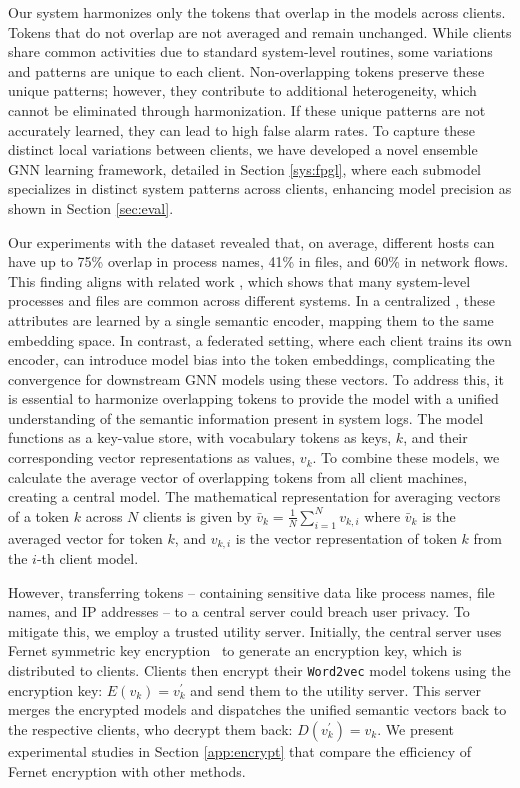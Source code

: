  Our system harmonizes only the tokens that overlap in the \wordvec models across clients. Tokens that do not overlap are not averaged and remain unchanged. While clients share common activities due to standard system-level routines, some variations and patterns are unique to each client. Non-overlapping tokens preserve these unique patterns; however, they contribute to additional heterogeneity, which cannot be eliminated through harmonization. If these unique patterns are not accurately learned, they can lead to high false alarm rates. To capture these distinct local variations between clients, we have developed a novel ensemble GNN learning framework, detailed in Section \ref{sys:fpgl}, where each submodel specializes in distinct system patterns across clients, enhancing model precision as shown in Section \ref{sec:eval}.

Our experiments with the \optc dataset revealed that, on average, different hosts can have up to 75\% overlap in process names, 41\% in files, and 60\% in network flows. This finding aligns with related work \cite{flash2024}, which shows that many system-level processes and files are common across different systems. In a centralized \pids, these attributes are learned by a single semantic encoder, mapping them to the same embedding space. In contrast, a federated setting, where each client trains its own encoder, can introduce model bias into the token embeddings, complicating the convergence for downstream GNN models using these vectors. To address this, it is essential to harmonize overlapping tokens to provide the model with a unified understanding of the semantic information present in system logs. 
The \wordvec model functions as a key-value store, with vocabulary tokens as keys, \(k\), and their corresponding vector representations as values, \(v_k\). To combine these models, we calculate the average vector of overlapping tokens from all client machines, creating a central model. The mathematical representation for averaging vectors of a token \(k\) across \(N\) clients is given by \(\bar{v}_k = \frac{1}{N}\sum_{i=1}^{N} v_{k,i}\) where \(\bar{v}_k\) is the averaged vector for token \(k\), and \(v_{k,i}\) is the vector representation of token \(k\) from the \(i\)-th client model.

However, transferring tokens -- containing sensitive data like process names, file names, and IP addresses -- to a central server could breach user privacy. To mitigate this, we employ a trusted utility server. Initially, the central server uses Fernet symmetric key encryption~\cite{ismail2020fernet,bokhari2016review} to generate an encryption key, which is distributed to clients. Clients then encrypt their \texttt{Word2vec} model tokens using the encryption key: \( E(v_{k}) = v_{k}^{'} \) and send them to the utility server. This server merges the encrypted models and dispatches the unified semantic vectors back to the respective clients, who decrypt them back: \( D(v_{k}^{'}) = v_{k} \). We present experimental studies in Section \ref{app:encrypt} that compare the efficiency of Fernet encryption with other methods.

